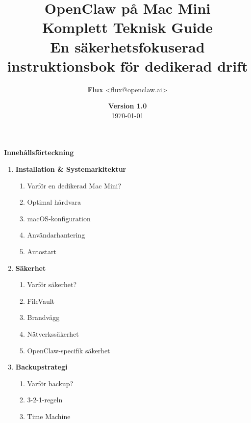 \documentclass[12pt,a4paper,swedish]{article}
\title{
    \vspace{-2cm}
    \color{primary}\textbf{OpenClaw på Mac Mini}\\
    \large Komplett Teknisk Guide\\
    \vspace{1cm}
    \normalsize En säkerhetsfokuserad instruktionsbok för dedikerad drift
}
\author{\textbf{Flux} \textless{flux@openclaw.ai}\textgreater}
\date{\textbf{Version 1.0} \\ \today}
\begin{document}
\maketitle
\thispagestyle{empty}

\vspace{2cm}

\begin{center}
    \color{secondary}\Large\textbf{Innehållsförteckning}
\end{center}

\vspace{1cm}

\begin{enumerate}
    \item \textbf{Installation \& Systemarkitektur} \dotfill\pageref{sec:del1}
    \begin{enumerate}
        \item Varför en dedikerad Mac Mini? \dotfill\pageref{sec:varfor-mini}
        \item Optimal hårdvara \dotfill\pageref{sec:hardvara}
        \item macOS-konfiguration \dotfill\pageref{sec:macos}
        \item Användarhantering \dotfill\pageref{sec:anvandare}
        \item Autostart \dotfill\pageref{sec:autostart}
    \end{enumerate}
    \item \textbf{Säkerhet} \dotfill\pageref{sec:del2}
    \begin{enumerate}
        \item Varför säkerhet? \dotfill\pageref{sec:varfor-sakerhet}
        \item FileVault \dotfill\pageref{sec:filevault}
        \item Brandvägg \dotfill\pageref{sec:brandvagge}
        \item Nätverkssäkerhet \dotfill\pageref{sec:natverk}
        \item OpenClaw-specifik säkerhet \dotfill\pageref{sec:openclaw-sakerhet}
    \end{enumerate}
    \item \textbf{Backupstrategi} \dotfill\pageref{sec:del3}
    \begin{enumerate}
        \item Varför backup? \dotfill\pageref{sec:varfor-backup}
        \item 3-2-1-regeln \dotfill\pageref{sec:321}
        \item Time Machine \dotfill\pageref{sec:timemachine}

\end{enumerate}
\end{enumerate}
\end{document}
